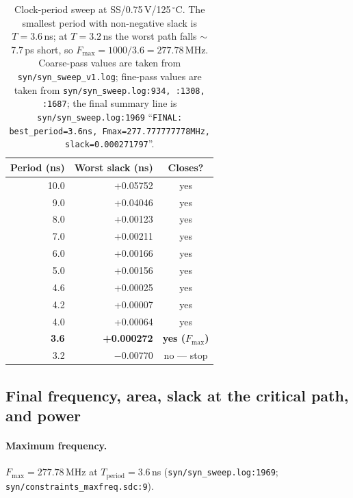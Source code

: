 \begin{table}[h]
\centering
\begin{tabular}{|r|r|c|}
\hline
\textbf{Period (ns)} & \textbf{Worst slack (ns)} & \textbf{Closes?} \\ \hline
10.0 & +0.05752 & yes \\ \hline
 9.0 & +0.04046 & yes \\ \hline
 8.0 & +0.00123 & yes \\ \hline
 7.0 & +0.00211 & yes \\ \hline
 6.0 & +0.00166 & yes \\ \hline
 5.0 & +0.00156 & yes \\ \hline
 4.6 & +0.00025 & yes \\ \hline
 4.2 & +0.00007 & yes \\ \hline
 4.0 & +0.00064 & yes \\ \hline
\textbf{3.6} & \textbf{+0.000272} & \textbf{yes ($F_\mathrm{max}$)} \\ \hline
 3.2 & $-$0.00770 & no --- stop \\ \hline
\end{tabular}
\caption{Clock-period sweep at SS/0.75\,V/125\,$^\circ$C.
The smallest period with non-negative slack is $T=3.6$\,ns; at
$T=3.2$\,ns the worst path falls $\sim$7.7\,ps short, so
$F_\mathrm{max}=1000/3.6=277.78$\,MHz.
Coarse-pass values are taken from \texttt{syn/syn\_sweep\_v1.log};
fine-pass values are taken from
\texttt{syn/syn\_sweep.log:934, :1308, :1687}; the final summary line
is \texttt{syn/syn\_sweep.log:1969}
``\texttt{FINAL: best\_period=3.6ns, Fmax=277.777777778MHz,
slack=0.000271797}''.}
\label{tab:syn_sweep}
\end{table}

\subsection{Final frequency, area, slack at the critical path, and power}

\paragraph{Maximum frequency.}
$F_\mathrm{max}=277.78$\,MHz at $T_\mathrm{period}=3.6$\,ns
(\texttt{syn/syn\_sweep.log:1969};
\texttt{syn/constraints\_maxfreq.sdc:9}).

